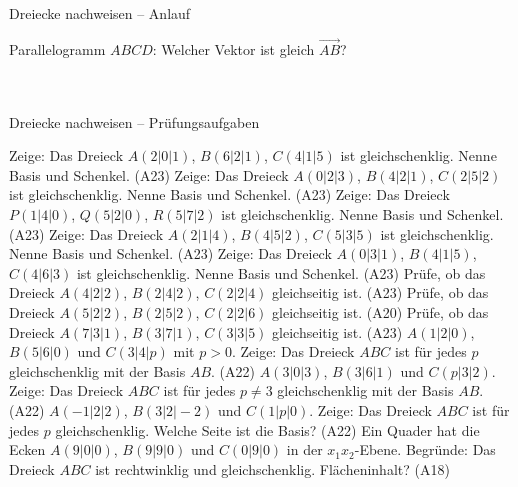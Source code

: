 \setcounter{aufgabe}{0}

\begin{aufgabe}{Dreiecke nachweisen – Anlauf}
\begin{teile}
\teil Parallelogramm $ABCD$: Welcher Vektor ist gleich $\overrightarrow{AB}$? \\  \\  \\ 
\end{teile}
\end{aufgabe}

\begin{aufgabe}{Dreiecke nachweisen – Prüfungsaufgaben}
\begin{teile}
\teil Zeige: Das Dreieck $A(2 | 0 | 1)$, $B(6 | 2 | 1)$, $C(4 | 1 | 5)$ ist gleichschenklig. Nenne Basis und Schenkel. \hfill (A23)
\teil Zeige: Das Dreieck $A(0 | 2 | 3)$, $B(4 | 2 | 1)$, $C(2 | 5 | 2)$ ist gleichschenklig. Nenne Basis und Schenkel. \hfill (A23)
\teil Zeige: Das Dreieck $P(1 | 4 | 0)$, $Q(5 | 2 | 0)$, $R(5 | 7 | 2)$ ist gleichschenklig. Nenne Basis und Schenkel. \hfill (A23)
\teil Zeige: Das Dreieck $A(2 | 1 | 4)$, $B(4 | 5 | 2)$, $C(5 | 3 | 5)$ ist gleichschenklig. Nenne Basis und Schenkel. \hfill (A23)
\teil Zeige: Das Dreieck $A(0 | 3 | 1)$, $B(4 | 1 | 5)$, $C(4 | 6 | 3)$ ist gleichschenklig. Nenne Basis und Schenkel. \hfill (A23)
\teil Prüfe, ob das Dreieck $A(4 | 2 | 2)$, $B(2 | 4 | 2)$, $C(2 | 2 | 4)$ gleichseitig ist. \hfill (A23)
\teil Prüfe, ob das Dreieck $A(5 | 2 | 2)$, $B(2 | 5 | 2)$, $C(2 | 2 | 6)$ gleichseitig ist. \hfill (A20)
\teil Prüfe, ob das Dreieck $A(7 | 3 | 1)$, $B(3 | 7 | 1)$, $C(3 | 3 | 5)$ gleichseitig ist. \hfill (A23)
\teil $A(1 | 2 | 0)$, $B(5 | 6 | 0)$ und $C(3 | 4 | p)$ mit $p > 0$. Zeige: Das Dreieck $ABC$ ist für jedes $p$ gleichschenklig mit der Basis $AB$. \hfill (A22)
\teil $A(3 | 0 | 3)$, $B(3 | 6 | 1)$ und $C(p | 3 | 2)$. Zeige: Das Dreieck $ABC$ ist für jedes $p \ne 3$ gleichschenklig mit der Basis $AB$. \hfill (A22)
\teil $A(-1 | 2 | 2)$, $B(3 | 2 | -2)$ und $C(1 | p | 0)$. Zeige: Das Dreieck $ABC$ ist für jedes $p$ gleichschenklig. Welche Seite ist die Basis? \hfill (A22)
\teil Ein Quader hat die Ecken $A(9 | 0 | 0)$, $B(9 | 9 | 0)$ und $C(0 | 9 | 0)$ in der $x_1x_2$-Ebene. Begründe: Das Dreieck $ABC$ ist rechtwinklig und gleichschenklig. Flächeninhalt? \hfill (A18)
\end{teile}
\end{aufgabe}

